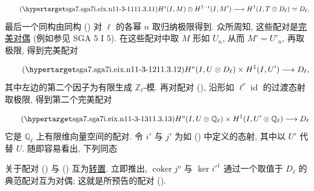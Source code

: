 \begin{equation}\tag{\SGARefTarget{sga7.sga7i.eix.n11-3-11}{11.3.11}}
H^i(I,M)\otimes H^{1-i}(I,M')
 \longrightarrow H^1(I,T\otimes D_\ell)\simeq D_\ell,
\end{equation}
最后一个同构由同构 () 对 $\ell$ 的各幂 $n$ 取归纳极限得到. 众所周知, 这些配对是\underline{完美对偶} (例如参见 SGA 5 I 5). 在这些配对中取 $M$ 形如 $U_n$, 从而 $M'=U'_n$, 再取极限, 得到完美配对

\begin{equation}\tag{\SGARefTarget{sga7.sga7i.eix.n11-3-12}{11.3.12}}
H^o(I,U\otimes D_\ell)\times H^1(I,U')\longrightarrow D_\ell,
\end{equation}
其中左边的第二个因子为有限生成 $\mathbb Z_\ell$-模. 再对配对 (), 沿形如 $\ell^r\operatorname{id}$ 的过渡态射取极限, 得到第二个完美配对

\begin{equation}\tag{\SGARefTarget{sga7.sga7i.eix.n11-3-13}{11.3.13}}
H^o(I,U\otimes\mathbb Q_\ell)
 \times H^1(I,U'\otimes\mathbb Q_\ell)
 \longrightarrow D_\ell
\end{equation}
它是 $\mathbb Q_\ell$ 上有限维向量空间的配对. 令 $i'$ 与 $j'$ 为如 () 中定义的态射, 其中以 $U'$ 代替 $U$. 随即容易看出, 下列同态

\begin{center}
\end{center}
关于配对 () 与 () 互为\underline{转置}. 立即推出, $\operatorname{coker}j^o$ 与 $\ker {i'}^1$ 通过一个取值于 $D_\ell$ 的典范配对互为对偶; 这就是所预告的配对 ().



